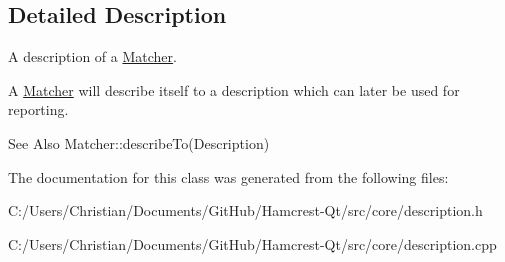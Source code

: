 \subsection{Detailed Description}
A description of a \hyperlink{class_hamcrest_qt_1_1_matcher}{Matcher}. 

A \hyperlink{class_hamcrest_qt_1_1_matcher}{Matcher} will describe itself to a description which can later be used for reporting.

\begin{DoxySeeAlso}{See Also}
Matcher\-::describe\-To(\-Description) 
\end{DoxySeeAlso}


The documentation for this class was generated from the following files\-:\begin{DoxyCompactItemize}
\item 
C\-:/\-Users/\-Christian/\-Documents/\-Git\-Hub/\-Hamcrest-\/\-Qt/src/core/description.\-h\item 
C\-:/\-Users/\-Christian/\-Documents/\-Git\-Hub/\-Hamcrest-\/\-Qt/src/core/description.\-cpp\end{DoxyCompactItemize}

